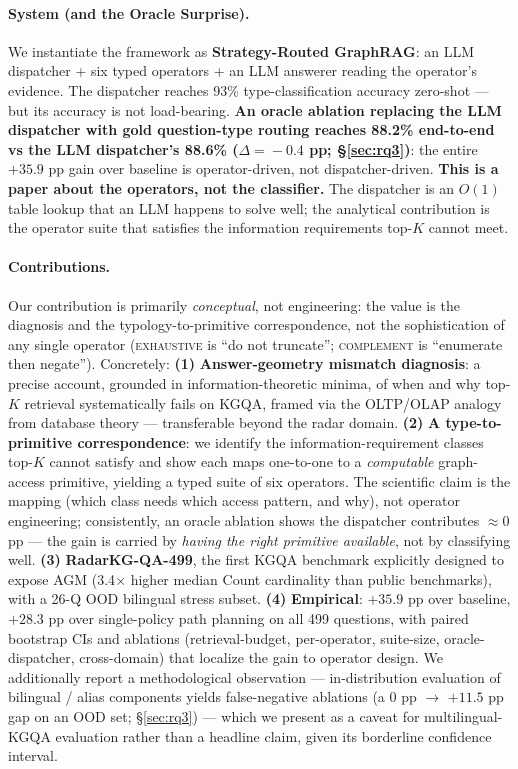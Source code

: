\documentclass[review]{elsarticle}
\newcommand{\op}[1]{\textsc{\small #1}}
\begin{document}
\paragraph{System (and the Oracle Surprise).}
We instantiate the framework as \textbf{Strategy-Routed GraphRAG}: an LLM dispatcher + six typed operators + an LLM answerer reading the operator's evidence. The dispatcher reaches 93\% type-classification accuracy zero-shot --- but its accuracy is not load-bearing. \textbf{An oracle ablation replacing the LLM dispatcher with gold question-type routing reaches 88.2\% end-to-end vs the LLM dispatcher's 88.6\% ($\Delta\!=\!-0.4$ pp; §\ref{sec:rq3})}: the entire $+35.9$ pp gain over baseline is operator-driven, not dispatcher-driven. \textbf{This is a paper about the operators, not the classifier.} The dispatcher is an $O(1)$ table lookup that an LLM happens to solve well; the analytical contribution is the operator suite that satisfies the information requirements top-$K$ cannot meet.

\paragraph{Contributions.}
Our contribution is primarily \emph{conceptual}, not engineering: the value is the diagnosis and the typology-to-primitive correspondence, not the sophistication of any single operator (\op{exhaustive} is ``do not truncate''; \op{complement} is ``enumerate then negate''). Concretely:
\textbf{(1)} \textbf{Answer-geometry mismatch diagnosis}: a precise account, grounded in information-theoretic minima, of when and why top-$K$ retrieval systematically fails on KGQA, framed via the OLTP/OLAP analogy from database theory --- transferable beyond the radar domain.
\textbf{(2)} \textbf{A type-to-primitive correspondence}: we identify the information-requirement classes top-$K$ cannot satisfy and show each maps one-to-one to a \emph{computable} graph-access primitive, yielding a typed suite of six operators. The scientific claim is the mapping (which class needs which access pattern, and why), not operator engineering; consistently, an oracle ablation shows the dispatcher contributes ${\approx}0$ pp --- the gain is carried by \emph{having the right primitive available}, not by classifying well.
\textbf{(3)} \textbf{RadarKG-QA-499}, the first KGQA benchmark explicitly designed to expose AGM (3.4$\times$ higher median Count cardinality than public benchmarks), with a 26-Q OOD bilingual stress subset.
\textbf{(4)} \textbf{Empirical}: $+35.9$ pp over baseline, $+28.3$ pp over single-policy path planning on all 499 questions, with paired bootstrap CIs and ablations (retrieval-budget, per-operator, suite-size, oracle-dispatcher, cross-domain) that localize the gain to operator design.
We additionally report a methodological observation --- in-distribution evaluation of bilingual / alias components yields false-negative ablations (a 0 pp $\to$ $+11.5$ pp gap on an OOD set; §\ref{sec:rq3}) --- which we present as a caveat for multilingual-KGQA evaluation rather than a headline claim, given its borderline confidence interval.
\end{document}
